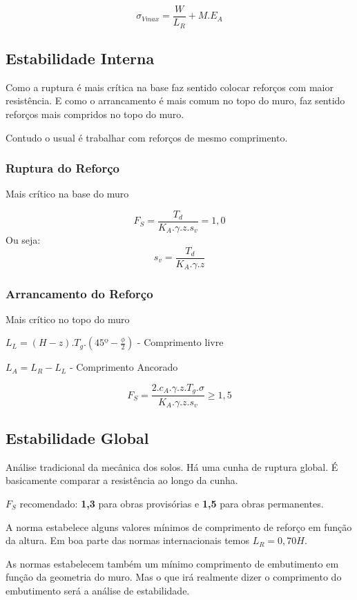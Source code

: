  \begin{equation*}
     \sigma_{Vmax} = \frac{W}{L_R} + M . E_A
 \end{equation*}
 
 
 \subsection{Estabilidade Interna}
 
 Como a ruptura é mais crítica na base faz sentido colocar reforços com maior resistência. 
 E como o arrancamento é mais comum no topo do muro, faz sentido reforços mais compridos no topo do muro.
 
 Contudo o usual é trabalhar com reforços de mesmo comprimento.
 
 \subsubsection{Ruptura do Reforço}
 Mais crítico na base do muro
 
 \begin{equation*}
     F_S = \frac{T_d}{K_A . \gamma . z . s_v} = 1,0
 \end{equation*}
 Ou seja:
 \begin{equation*}
     s_v = \frac{T_d}{K_A . \gamma . z}
 \end{equation*}
 
 
 \subsubsection{Arrancamento do Reforço}
 
 Mais crítico no topo do muro
 
 $L_L = (H - z) . T_g . (45º - \tfrac{\phi}{2})$ - Comprimento livre
 
 $L_A = L_R - L_L$ - Comprimento Ancorado
 
 \begin{equation*}
     F_S = \frac{2 . c_A . \gamma . z . T_g . \sigma}{K_A . \gamma . z . s_v} \geq 1,5
 \end{equation*}
 
 
 
 \subsection{Estabilidade Global}
 
 Análise tradicional da mecânica dos solos. Há uma cunha de ruptura global. É basicamente comparar a resistência ao longo da cunha.
 
 $F_S$ recomendado: \textbf{1,3} para obras provisórias e \textbf{1,5} para obras permanentes.
 
 A norma estabelece alguns valores mínimos de comprimento de reforço em função da altura. Em boa parte das normas internacionais temos $L_R = 0,70H$.
 
 As normas estabelecem também um mínimo comprimento de embutimento em função da geometria do muro. Mas o que irá realmente dizer o comprimento do embutimento será a análise de estabilidade.